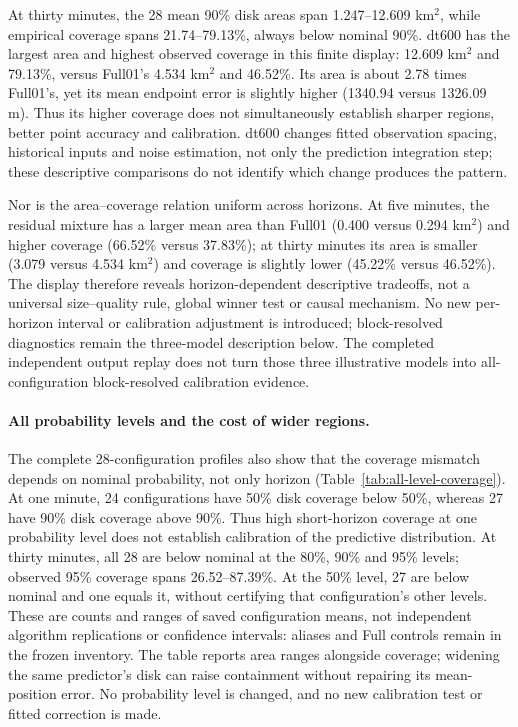 \documentclass[11pt]{article}
\begin{document}
At thirty minutes, the 28 mean 90\% disk areas span 1.247--12.609 km\(^{2}\),
while empirical coverage spans 21.74--79.13\%, always below nominal 90\%.
dt600 has the largest area and highest observed coverage in this finite
display: 12.609 km\(^{2}\) and 79.13\%, versus Full01's 4.534 km\(^{2}\)
and 46.52\%. Its area is about 2.78 times Full01's, yet its mean endpoint
error is slightly higher (1340.94 versus 1326.09 m). Thus its higher coverage
does not simultaneously establish sharper regions, better point accuracy
and calibration. dt600 changes fitted observation spacing, historical inputs
and noise estimation, not only the prediction integration step; these
descriptive comparisons do not identify which change produces the pattern.

Nor is the area--coverage relation uniform across horizons. At five minutes,
the residual mixture has a larger mean area than Full01 (0.400 versus
0.294 km\(^{2}\)) and higher coverage (66.52\% versus 37.83\%); at thirty
minutes its area is smaller (3.079 versus 4.534 km\(^{2}\)) and coverage
is slightly lower (45.22\% versus 46.52\%). The display therefore reveals
horizon-dependent descriptive tradeoffs, not a universal size--quality rule,
global winner test or causal mechanism. No new per-horizon interval or
calibration adjustment is introduced; block-resolved diagnostics remain
the three-model description below. The completed independent output replay
does not turn those three illustrative models into all-configuration
block-resolved calibration evidence.

\FloatBarrier

\paragraph{All probability levels and the cost of wider regions.}
The complete 28-configuration profiles also show that the coverage mismatch
depends on nominal probability, not only horizon
(Table~\ref{tab:all-level-coverage}). At one minute, 24 configurations have
50\% disk coverage below 50\%, whereas 27 have 90\% disk coverage above
90\%. Thus high short-horizon coverage at one probability level does not
establish calibration of the predictive distribution. At thirty minutes,
all 28 are below nominal at the 80\%, 90\% and 95\% levels; observed
95\% coverage spans 26.52--87.39\%. At the 50\% level, 27 are below
nominal and one equals it, without certifying that configuration's other
levels. These are counts and ranges of saved configuration means, not
independent algorithm replications or confidence intervals: aliases and
Full controls remain in the frozen inventory. The table reports area
ranges alongside coverage; widening the same predictor's disk can raise
containment without repairing its mean-position error. No probability
level is changed, and no new calibration test or fitted correction is made.
\end{document}
